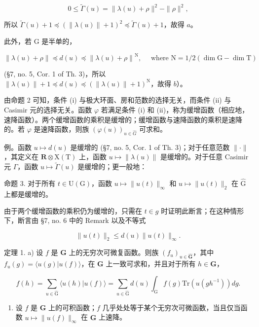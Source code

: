 \[
0 \leq \tilde {\Gamma} (u) = \| \lambda (u) + \rho \| ^ {2} - \| \rho \| ^ {2},
\]

所以 \(\tilde{\Gamma}(u) + 1 \preccurlyeq (\|\lambda(u)\| + 1)^2 \preccurlyeq \tilde{\Gamma}(u) + 1\)，故得 \(a\)。

此外，若 G 是半单的，

\[
\left\| \lambda (u) + \rho \right\| \preccurlyeq d (u) \preccurlyeq \left\| \lambda (u) + \rho \right\| ^ {\mathrm{N}}, \quad \text { where } \mathrm{N} = 1 / 2 (\dim \mathrm{G} - \dim \mathrm{T})
\]

(§7, no. 5, Cor. 1 of Th. 3)，所以 \(\| \lambda(u) \| + 1 \preccurlyeq d(u) \preccurlyeq (\| \lambda(u) \| + 1)^{\mathrm{N}}\)，故得 \(b\)）。

由命题 2 可知，条件 (i) 与极大环面、房和范数的选择无关，而条件 (ii) 与 Casimir 元的选择无关。函数 \(\varphi\) 若满足条件 (i) 和 (ii)，称为缓增函数（相应地，速降函数）。两个缓增函数的乘积是缓增的；缓增函数与速降函数的乘积是速降的。若 \(\varphi\) 是速降函数，则族 \((\varphi(u))_{u\in\hat{G}}\) 可求和。

例。函数 \(u \mapsto d(u)\) 是缓增的 (§7, no. 5, Cor. 1 of Th. 3)；对于任意范数 \(\| \cdot \|\)，其定义在 \(\mathbf{R} \otimes \mathrm{X(T)}\) 上，函数 \(u \mapsto \| \lambda(u) \|\) 是缓增的。对于任意 Casimir 元 \(\Gamma\)，函数 \(u \mapsto \tilde{\Gamma}(u)\) 是缓增的；更一般地：

命题 3. 对于所有 \(t \in \mathrm{U}(\mathrm{G})\)，函数 \(u \mapsto \| u(t) \|_{\infty}\) 和 \(u \mapsto \| u(t) \|_2\) 在 \(\hat{\mathrm{G}}\) 上都是缓增的。

由于两个缓增函数的乘积仍为缓增的，只需在 \(t \in g\) 时证明此断言；在这种情形下，断言由 §7, no. 6 中的 Remark 以及不等式

\[
\| u (t) \| _ {2} \leq d (u) \| u (t) \| _ {\infty}.
\]

定理 1. a) 设 \(f\) 是 \(\mathbf{G}\) 上的无穷次可微复函数。则族 \((f_u)_{u\in \hat{\mathbf{G}}}\)，其中 \(f_{u}(g) = \langle u(g)|u(f)\rangle\)，在 \(\mathbf{G}\) 上一致可求和，并且对于所有 \(h\in \mathbf{G}\)，

\[
f (h) = \sum_ {u \in \hat {\mathrm{G}}} \langle u (h) | u (f) \rangle = \sum_ {u \in \hat {\mathrm{G}}} d (u) \int_ {\mathrm{G}} f (g) \mathrm{Tr} (u (g h ^ {- 1}))   d g.
\]

\begin{enumerate}
\def\labelenumi{\alph{enumi})}
\setcounter{enumi}{1}
\tightlist
\item
  设 \(f\) 是 \(\mathbf{G}\) 上的可积函数；\(f\) 几乎处处等于某个无穷次可微函数，当且仅当函数 \(u \mapsto \| u(f) \|_{\infty}\) 在 \(\hat{\mathbf{G}}\) 上速降。
\end{enumerate}

